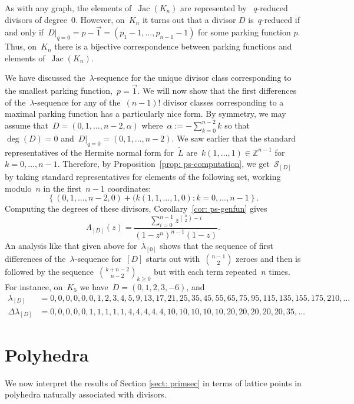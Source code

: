 \documentclass{amsart}
\DeclareMathOperator{\Jac}{Jac}
\newcommand{\secondary}{\mathcal{S}}
\newcommand{\Z}{\mathbb{Z}}
\newcommand{\tL}{\tilde{L}}
\begin{document}
As with any graph, the elements of~$\Jac(K_n)$ are represented by ~$q$-reduced
divisors of degree~$0$. However, on~$K_n$ it turns out that a divisor $D$ is~$q$-reduced if and only
if~$D|_{q=0}=p-\vec{1}=(p_1-1,\dots,p_{n-1}-1)$ for some parking function $p$.  
Thus, on~$K_n$ there is a bijective correspondence between parking
functions and elements of~$\Jac(K_n)$.

We have discussed the~$\lambda$-sequence for the unique divisor class
corresponding to the smallest parking function,~$p=\vec{1}$.  We will now show
that the first differences of the~$\lambda$-sequence for any of the~$(n-1)!$
divisor classes corresponding to a maximal parking function has a particularly
nice form.  By symmetry, we may assume that~$D=(0,1,\dots,n-2,\alpha)$
where~$\alpha:=-\sum_{k=0}^{n-2}k$ so that~$\deg(D)=0$
and~$D|_{q=0}=(0,1,\dots,n-2)$.  We saw earlier that the standard
representatives of the Hermite normal form for~$\tL$
are~$k(1,\dots,1)\in\Z^{n-1}$ for~$k=0,\dots,n-1$.  Therefore, by
Proposition~\ref{prop: ps-computation}, we get~$\secondary_{[D]}$ by taking
standard representatives for elements of the following set, working modulo~$n$ in the
first~$n-1$ coordinates:
\[
  \left\{ (0,1,\dots,n-2,0)+(k(1,1,\dots,1,0):k=0,\dots,n-1\right\}.
\]
Computing the degrees of these divisors, Corollary~\ref{cor: ps-genfun} gives
\[
  \Lambda_{[D]}(z)=\frac{\sum_{i=0}^{n-1}z^{\binom{n}{2}-i}}{(1-z^n)^{n-1}(1-z)}.
\]
An analysis like that given above for~$\lambda_{[0]}$ shows that
the sequence of first differences of the~$\lambda$-sequence for~$[D]$
starts out
with~$\binom{n-1}{2}$ zeroes and then is followed by the
sequence~$\binom{k+n-2}{n-2}_{k\geq0}$ but with each term repeated~$n$ times.
For instance, on~$K_5$ we have~$D=(0,1,2,3,-6)$, and
\begin{align*}
  \lambda_{[D]}&=
  0, 0, 0, 0, 0, 0, 1, 2, 3, 4, 5, 9, 13, 17, 21, 25, 35, 45, 55, 65, 75, 95,
  115, 135, 155, 175, 210, \dots\\[5pt]
  \Delta\lambda_{[D]}&=
  0, 0, 0, 0, 0, 1, 1, 1, 1, 1, 4, 4, 4, 4, 4, 10, 10, 10, 10, 10, 20, 20,
  20, 20, 20, 35,\dots
\end{align*}

\section{Polyhedra}\label{sect: poly} 
We now interpret the results of Section \ref{sect: primsec} in terms of lattice
points in polyhedra naturally associated with divisors.
\end{document}
